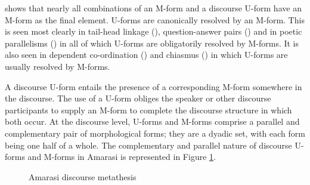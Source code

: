  shows that nearly
all combinations of an M-form and a discourse U-form
have an M-form as the final element.
U-forms are canonically resolved by an M-form.
This is seen most clearly in tail-head linkage (),
question-answer pairs () and in poetic parallelisms () 
in all of which U-forms are obligatorily resolved by M-forms.
It is also seen in dependent co-ordination () and chiasmus ()
in which U-forms are usually resolved by M-forms.

A discourse U-form entails the presence of a
corresponding M-form somewhere in the discourse.
The use of a U-form obliges the speaker
or other discourse participants to supply an M-form
to complete the discourse structure in which both occur.
At the discourse level, U-forms and M-forms
comprise a parallel and complementary pair of morphological forms;
they are a dyadic set, with each form being one half of a whole.
The complementary and parallel nature of discourse U-forms and M-forms
in Amarasi is represented in Figure \ref{fig:AmaDisMet}.

\begin{figure}[h]
	\caption{Amarasi discourse metathesis}\label{fig:AmaDisMet}
\end{figure}
